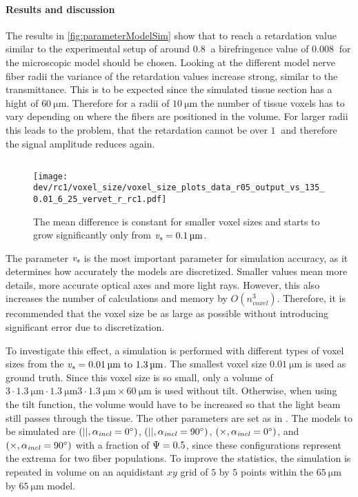 \paragraph{Results and discussion}
The results in \cref{fig:parameterModelSim} show that to reach a retardation value similar to the experimental setup of around $\SI{0.8}{}$ a birefringence value of $\SI{0.008}{}$ for the microscopic model should be chosen.
Looking at the different model nerve fiber radii the variance of the retardation values increase strong, similar to the transmittance.
This is to be expected since the simulated tissue section has a hight of $\SI{60}{\micro\meter}$.
Therefore for a radii of $\SI{10}{\micro\meter}$ the number of tissue voxels has to vary depending on where the fibers are positioned in the volume.
For larger radii this leads to the problem, that the retardation cannot be over $\SI{1}{}$ and therefore the signal amplitude reduces again.
%
%
%
\subsection{\Voxelsize{} \texorpdfstring{\voxelsize{}}{}}
%
\begin{figure}[!t]%
\centering
\texttt{[image: dev/rc1/voxel\_size/voxel\_size\_plots\_data\_r05\_output\_vs\_135\_0.01\_6\_25\_vervet\_r\_rc1.pdf]}
\caption{The mean difference is constant for smaller voxel sizes and starts to grow significantly only from $\voxelsize=\SI{0.1}{\micro\meter}$.}
\label{fig:voxelsizeNoise}
\end{figure}
%
The parameter \Voxelsize{} $\textnormal{$\mathit{v_{s}}$}$ is the most important parameter for simulation accuracy, as it determines how accurately the models are discretized.
Smaller values mean more details, more accurate optical axes and more light rays.
However, this also increases the number of calculations and memory by $O(n_{\mathit{voxel}}^3)$.
Therefore, it is recommended that the voxel size be as large as possible without introducing significant error due to discretization.
\par
%
To investigate this effect, a simulation is performed with different types of voxel sizes from the $\voxelsize = \SIrange{0.01}{1.3}{\micro\meter}$.
The smallest voxel size $\SI{0.01}{\micro\meter}$ is used as ground truth.
Since this voxel size is so small, only a volume of $3 \cdot \SI{1.3}{\micro\meter} \cdot \SI{1.3}{\micro\meter} 3 \cdot \SI{1.3}{\micro\meter} \times \SI{60}{\micro\meter}$ is used without tilt.
Otherwise, when using the tilt function, the volume would have to be increased so that the light beam still passes through the tissue.
The other parameters are set as in \dummy{}.
The models to be simulated are $(||,\textnormal{$\alpha_{\mathit{incl}}$} = \SI{0}{\degree})$, $(||,\textnormal{$\alpha_{\mathit{incl}}$} = \SI{90}{\degree})$, $(\times, \textnormal{$\alpha_{\mathit{incl}}$} = \SI{0}{\degree})$, and $(\times,\textnormal{$\alpha_{\mathit{incl}}$} = \SI{90}{\degree})$ with a fraction of $\textnormal{$\Psi$} = \SI{0.5}{}$, since these configurations represent the extrema for two fiber populations.
To improve the statistics, the simulation is repeated in volume on an aquidistant $xy$ grid of $\num{5}$ by $\num{5}$ points within the $\SI{65}{\micro\meter}$ by $\SI{65}{\micro\meter}$ model.
%
